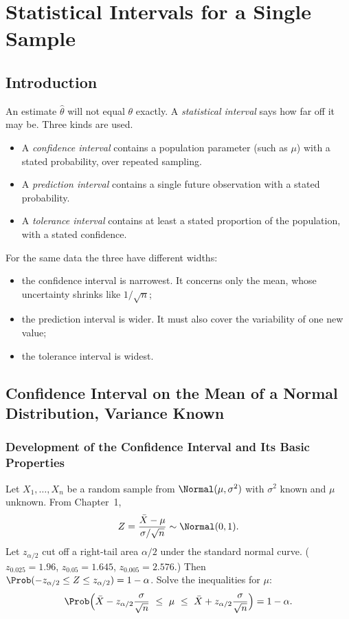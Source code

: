 \chapter{Statistical Intervals for a Single Sample}

\section{Introduction}

An estimate $\hat\theta$ will not equal $\theta$ exactly. A \emph{statistical interval} says how far off it may be. Three kinds are used.

\begin{itemize}
  \item A \emph{confidence interval} contains a population parameter (such as $\mu$) with a stated probability, over repeated sampling.
  \item A \emph{prediction interval} contains a single future observation with a stated probability.
  \item A \emph{tolerance interval} contains at least a stated proportion of the population, with a stated confidence.
\end{itemize}

For the same data the three have different widths:
\begin{itemize}
  \item the confidence interval is narrowest. It concerns only the mean, whose uncertainty shrinks like $1/\sqrt n$;
  \item the prediction interval is wider. It must also cover the variability of one new value;
  \item the tolerance interval is widest.
\end{itemize}

\section{Confidence Interval on the Mean of a Normal Distribution, Variance Known}

\subsection{Development of the Confidence Interval and Its Basic Properties}

Let $X_1,\dots,X_n$ be a random sample from $\Normal(\mu,\sigma^2)$ with $\sigma^2$ known and $\mu$ unknown. From Chapter~1,
\[ Z=\frac{\bar{X}-\mu}{\sigma/\sqrt n}\sim\Normal(0,1). \]
Let $z_{\alpha/2}$ cut off a right-tail area $\alpha/2$ under the standard normal curve. ($z_{0.025}=1.96$, $z_{0.05}=1.645$, $z_{0.005}=2.576$.) Then $\Prob(-z_{\alpha/2}\le Z\le z_{\alpha/2})=1-\alpha$. Solve the inequalities for $\mu$:
\[ \Prob\Big(\bar{X}-z_{\alpha/2}\frac{\sigma}{\sqrt n}\ \le\ \mu\ \le\ \bar{X}+z_{\alpha/2}\frac\sigma{\sqrt n}\Big)=1-\alpha. \]


